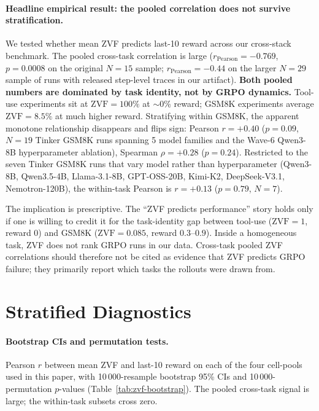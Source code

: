 \documentclass{article}
\begin{document}
\paragraph{Headline empirical result: the pooled correlation does not
survive stratification.}
We tested whether mean ZVF predicts last-10 reward across our cross-stack
benchmark. The pooled cross-task correlation is large ($r_{\text{Pearson}}
= -0.769$, $p = 0.0008$ on the original $N{=}15$ sample;
$r_{\text{Pearson}} = -0.44$ on the larger $N{=}29$ sample of runs with
released step-level traces in our artifact). \textbf{Both pooled numbers
are dominated by task identity, not by GRPO dynamics.} Tool-use experiments
sit at $\mathrm{ZVF} = 100\%$ at $\sim$0\% reward; GSM8K experiments
average $\mathrm{ZVF} = 8.5\%$ at much higher reward. Stratifying within
GSM8K, the apparent monotone relationship disappears and flips sign:
Pearson $r = +0.40$ ($p = 0.09$, $N{=}19$ Tinker GSM8K runs spanning 5
model families and the Wave-6 Qwen3-8B hyperparameter ablation), Spearman
$\rho = +0.28$ ($p = 0.24$). Restricted to the seven Tinker GSM8K runs that
vary model rather than hyperparameter (Qwen3-8B, Qwen3.5-4B,
Llama-3.1-8B, GPT-OSS-20B, Kimi-K2, DeepSeek-V3.1, Nemotron-120B), the
within-task Pearson is $r = +0.13$ ($p = 0.79$, $N{=}7$).

The implication is prescriptive. The ``ZVF predicts performance'' story
holds only if one is willing to credit it for the task-identity gap
between tool-use ($\mathrm{ZVF}{=}1$, reward $0$) and GSM8K
($\mathrm{ZVF}{=}0.085$, reward $0.3$--$0.9$). Inside a homogeneous task,
ZVF does not rank GRPO runs in our data. Cross-task pooled ZVF
correlations should therefore not be cited as evidence that ZVF predicts
GRPO failure; they primarily report which tasks the rollouts were drawn
from.

\section*{Stratified Diagnostics}
\label{sec:stratified-diagnostics}

\paragraph{Bootstrap CIs and permutation tests.}
Pearson $r$ between mean ZVF and last-10 reward on each of the four cell-pools
used in this paper, with 10\,000-resample bootstrap 95\% CIs and
10\,000-permutation $p$-values (Table~\ref{tab:zvf-bootstrap}). The pooled
cross-task signal is large; the within-task subsets cross zero.
\end{document}
